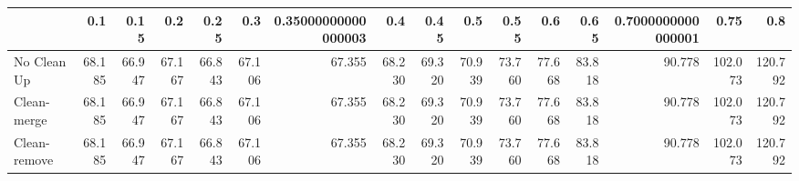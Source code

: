 \begin{tabular}{lrrrrrrrrrrrrrrr}
\toprule
{} &    0.1 &   0.15 &    0.2 &   0.25 &    0.3 & 0.35000000000000003 &    0.4 &   0.45 &    0.5 &   0.55 &    0.6 &   0.65 & 0.7000000000000001 &    0.75 &     0.8 \\
\midrule
No Clean Up  & 68.185 & 66.947 & 67.167 & 66.843 & 67.106 &              67.355 & 68.230 & 69.320 & 70.939 & 73.760 & 77.668 & 83.818 &             90.778 & 102.073 & 120.792 \\
Clean-merge  & 68.185 & 66.947 & 67.167 & 66.843 & 67.106 &              67.355 & 68.230 & 69.320 & 70.939 & 73.760 & 77.668 & 83.818 &             90.778 & 102.073 & 120.792 \\
Clean-remove & 68.185 & 66.947 & 67.167 & 66.843 & 67.106 &              67.355 & 68.230 & 69.320 & 70.939 & 73.760 & 77.668 & 83.818 &             90.778 & 102.073 & 120.792 \\
\bottomrule
\end{tabular}
